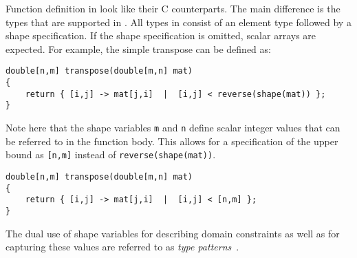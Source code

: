 Function definition in \sac{} look like their C counterparts.
The main difference is the types that are supported in \sac{}.
All types in \sac{} consist of an element type followed by a shape specification.
If the shape specification is omitted, scalar arrays are expected.
For example, the simple transpose can be defined as:
%
\begin{lstlisting}
double[n,m] transpose(double[m,n] mat)
{
    return { [i,j] -> mat[j,i]  |  [i,j] < reverse(shape(mat)) };
}
\end{lstlisting}
%
Note here that the shape variables \texttt{m} and \texttt{n} define scalar integer values that can be referred to in the function body.
This allows for a specification of the upper bound as \texttt{[n,m]} instead of \texttt{reverse(shape(mat))}.
%
\begin{lstlisting}
double[n,m] transpose(double[m,n] mat)
{
    return { [i,j] -> mat[j,i]  |  [i,j] < [n,m] };
}
\end{lstlisting}
%
The dual use of shape variables for describing domain constraints as well as for capturing these values are referred to as \textit{type patterns}~\cite{sac-typepattern}.

